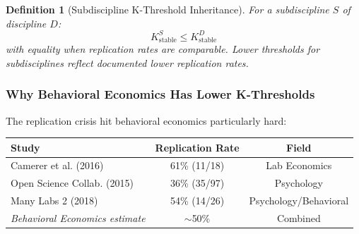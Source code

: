 \documentclass[11pt,a4paper]{article}
\newtheorem{definition}{Definition}[section]
\begin{document}
\begin{center}
\end{center}

\begin{definition}[Subdiscipline K-Threshold Inheritance]
For a subdiscipline $S$ of discipline $D$:
\[
K_{\text{stable}}^S \leq K_{\text{stable}}^D
\]
with equality when replication rates are comparable. Lower thresholds for subdisciplines reflect documented lower replication rates.
\end{definition}

\subsubsection{Why Behavioral Economics Has Lower K-Thresholds}

The replication crisis hit behavioral economics particularly hard:

\begin{center}
\begin{tabular}{lcc}
\toprule
\textbf{Study} & \textbf{Replication Rate} & \textbf{Field} \\
\midrule
Camerer et al. (2016) & 61\% (11/18) & Lab Economics \\
Open Science Collab. (2015) & 36\% (35/97) & Psychology \\
Many Labs 2 (2018) & 54\% (14/26) & Psychology/Behavioral \\
\midrule
\textit{Behavioral Economics estimate} & $\sim$50\% & Combined \\
\bottomrule
\end{tabular}
\end{center}
\end{document}
